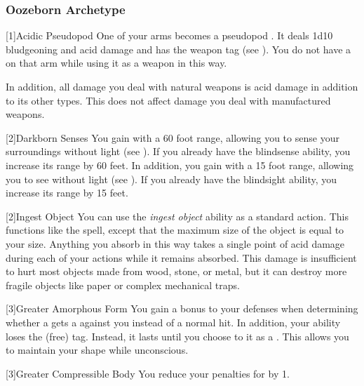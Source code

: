         \subsubsection{Oozeborn Archetype}

            [1]{Acidic Pseudopod} One of your arms becomes a pseudopod .
            It deals 1d10 bludgeoning and acid damage and has the  weapon tag (see ).
            You do not have a  on that arm while using it as a weapon in this way.

            In addition, all damage you deal with natural weapons is acid damage in addition to its other types.
            This does not affect damage you deal with manufactured weapons.

            [2]{Darkborn Senses} You gain  with a 60 foot range, allowing you to sense your surroundings without light (see ).
            If you already have the blindsense ability, you increase its range by 60 feet.
            In addition, you gain  with a 15 foot range, allowing you to see without light (see ).
            If you already have the blindsight ability, you increase its range by 15 feet.

            [2]{Ingest Object} You can use the \textit{ingest object} ability as a standard action.
            This functions like the  spell, except that the maximum size of the object is equal to your size.
            Anything you absorb in this way takes a single point of  acid damage during each of your actions while it remains absorbed.
            This damage is insufficient to hurt most objects made from wood, stone, or metal, but it can destroy more fragile objects like paper or complex mechanical traps.

            [3]{Greater Amorphous Form} You gain a  bonus to your defenses when determining whether a  gets a  against you instead of a normal hit.
            In addition, your  ability loses the  (free) tag.
            Instead, it lasts until you choose to  it as a .
            This allows you to maintain your shape while unconscious.

            [3]{Greater Compressible Body} You reduce your penalties for \squeezing by 1.

